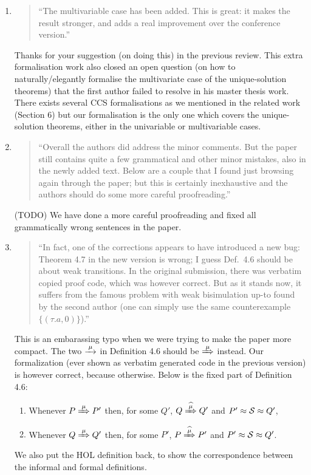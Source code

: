 \begin{enumerate}

\item \begin{quote}
    ``The multivariable case has been added. This is great: it makes the result stronger, and adds a real improvement over the conference version.''
  \end{quote}
  \Mark
  Thanks for your suggestion (on doing this) in the previous
  review. This extra formalisation work also closed an open question
  (on how to naturally/elegantly formalise the multivariate case of
  the unique-solution theorems) that the first author failed to
  resolve in his master thesis work. There exists several CCS
  formalisations as we mentioned in the related work (Section 6) but
  our formalisation is the only one which covers the unique-solution
  theorems, either in the univariable or multivariable cases.

\item \begin{quote}
``Overall the authors did address the minor comments. But the paper
still contains quite a few grammatical and other minor mistakes, also
in the newly added text. Below are a couple that I found just browsing
again through the paper; but this is certainly inexhaustive and the
authors should do some more careful proofreading.''
\end{quote}
\Mark
(TODO) We have done a more careful proofreading and fixed all
grammatically wrong sentences in the paper.

\item \begin{quote}
    ``In fact, one of the corrections appears to have introduced a new
    bug: Theorem 4.7 in the new version is wrong; I guess Def.~4.6
    should be about weak transitions. In the original submission,
    there was verbatim copied proof code, which was however
    correct. But as it stands now, it suffers from the famous problem
    with weak bisimulation up-to found by the second author (one can
    simply use the same counterexample $\{(\tau. a , 0)\}$).''
  \end{quote}
  \Mark
  This is an embarassing typo when we were trying to make the paper
  more compact. The two $\arr{\mu}$ in
  Definition 4.6 should be $\Arr{\mu}$ instead. Our formalization
  (ever shown as verbatim generated code in the previous version) is
  however correct, because otherwise. Below is the fixed part of Definition 4.6:
\begin{enumerate}
\item Whenever $P \Arr{\mu} P'$ then, for some $Q'$, $Q \Arcap{\mu} Q'$ and $P' \approx {\cal S} \approx Q'$,
\item Whenever $Q \Arr{\mu} Q'$ then, for some $P'$, $P \Arcap{\mu} P'$ and $P' \approx {\cal S} \approx Q'$.
\end{enumerate}
We also put the HOL definition back, to show the correspondence between the informal and formal definitions.

\end{enumerate}

